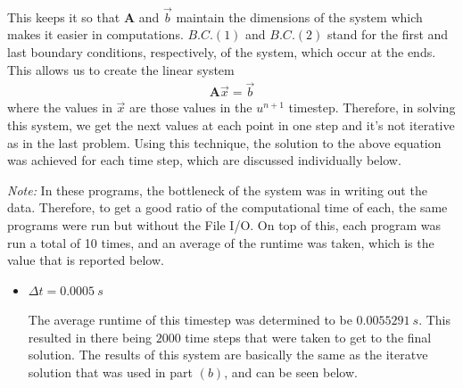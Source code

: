 \documentclass[addpoints]{exam}
\newcommand{\Dt}{\Delta t}
\begin{document}
\begin{questions}
\begin{parts}
\begin{solution}
\begin{align}
\end{align}
This keeps it so that $\mathbf{A}$ and $\vec{b}$ maintain the dimensions of the system which makes it easier in computations. $B.C.(1)$ and $B.C.(2)$ stand for the first and last boundary conditions, respectively, of the system, which occur at the ends. This allows us to create the linear system
\begin{align}
\mathbf{A}\vec{x} = \vec{b}
\end{align}
where the values in $\vec{x}$ are those values in the $u^{n+1}$ timestep. Therefore, in solving this system, we get the next values at each point in one step and it's not iterative as in the last problem. Using this technique, the solution to the above equation was achieved for each time step, which are discussed individually below.

{\em Note:} In these programs, the bottleneck of the system was in writing out the data. Therefore, to get a good ratio of the computational time of each, the same programs were run but without the File I/O. On top of this, each program was run a total of 10 times, and an average of the runtime was taken, which is the value that is reported below.

\begin{itemize}
\item $\Dt = 0.0005\ s$

The average runtime of this timestep was determined to be $0.0055291\ s$. This resulted in there being $2000$ time steps that were taken to get to the final solution. The results of this system are basically the same as the iteratve solution that was used in part $(b)$, and can be seen below.


\end{itemize}
\end{solution}
\end{parts}
\end{questions}
\end{document}
